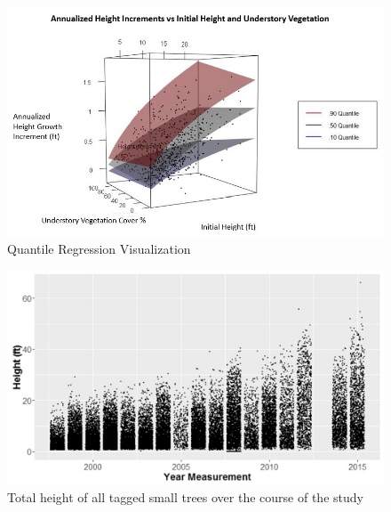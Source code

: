 \documentclass[11pt, letterpaper, fleqn]{article}
\begin{document}
\begin{figure}[ht]
\begin{center}
    \includegraphics[width=160mm]{threedveg.jpg}
    \caption{Quantile Regression Visualization}
    \label{fig:Quantregvis}
\end{center}
\end{figure}

\begin{figure}[ht]
\begin{center}
    \includegraphics[width=160mm]{all_trees.jpg}
    \caption{Total height of all tagged small trees over the course of the study}
    \label{fig:alltrees}
\end{center}
\end{figure}
\end{document}
